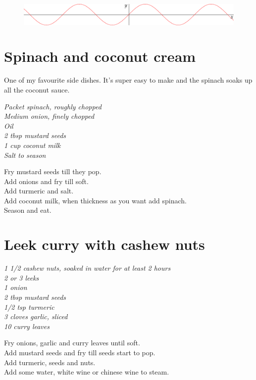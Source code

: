 \documentclass{tufte-book}
\begin{document}
\begin{figure}[h]
  \includegraphics[width=\linewidth]{sine.pdf}%
\end{figure}



\section{Spinach and coconut cream}

One of my favourite side dishes. It's super easy to make and the spinach soaks up all the coconut sauce.

\smallskip
\emph{Packet spinach, roughly chopped
\\Medium onion, finely chopped
\\Oil
\\2 tbsp mustard seeds
\\1 cup coconut milk
\\Salt to season
}

\smallskip
Fry mustard seeds till they pop.
\\Add onions and fry till soft.
\\Add turmeric and salt.
\\Add coconut milk, when thickness as you want add spinach.
\\Season and eat.


\section{Leek curry with cashew nuts}
\emph{1 1/2 cashew nuts, soaked in water for at least 2 hours
\\2 or 3 leeks
\\1 onion
\\2 tbsp mustard seeds
\\1/2 tsp turmeric
\\3 cloves garlic, sliced
\\10 curry leaves
}

\smallskip
Fry onions, garlic and curry leaves until soft.
\\Add mustard seeds and fry till seeds start to pop.
\\Add turmeric, seeds and nuts.
\\Add some water, white wine or chinese wine to steam.
\end{document}
